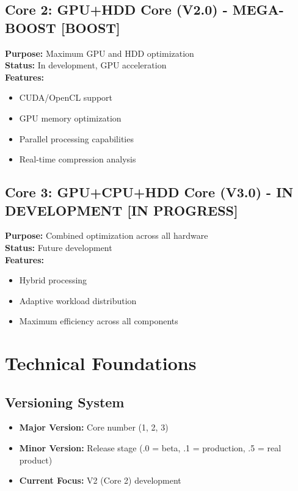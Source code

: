\documentclass[12pt,a4paper]{article}
\begin{document}
\subsection{Core 2: GPU+HDD Core (V2.0) - MEGA-BOOST [BOOST]}

\textbf{Purpose:} Maximum GPU and HDD optimization\\
\textbf{Status:} In development, GPU acceleration\\
\textbf{Features:}
\begin{itemize}
    \item CUDA/OpenCL support
    \item GPU memory optimization
    \item Parallel processing capabilities
    \item Real-time compression analysis
\end{itemize}

\subsection{Core 3: GPU+CPU+HDD Core (V3.0) - IN DEVELOPMENT [IN PROGRESS]}

\textbf{Purpose:} Combined optimization across all hardware\\
\textbf{Status:} Future development\\
\textbf{Features:}
\begin{itemize}
    \item Hybrid processing
    \item Adaptive workload distribution
    \item Maximum efficiency across all components
\end{itemize}

\section{Technical Foundations}

\subsection{Versioning System}
\begin{itemize}
    \item \textbf{Major Version:} Core number (1, 2, 3)
    \item \textbf{Minor Version:} Release stage (.0 = beta, .1 = production, .5 = real product)
    \item \textbf{Current Focus:} V2 (Core 2) development
\end{itemize}
\end{document}
